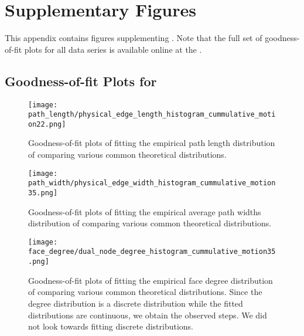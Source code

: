 
\chapter{Supplementary Figures}\label{app:network_analysis}

This appendix contains figures supplementing . Note that the full set of goodness-of-fit plots for all data series is available online at the \SMGR. 

\section{Goodness-of-fit Plots for }

\begin{figure}[!htbp]
\begin{center}%
  \texttt{[image: path\_length/physical\_edge\_length\_histogram\_cummulative\_motion22.png]}
\end{center}%
\caption[Goodness-of-fit plots - Path lengths]{Goodness-of-fit plots of fitting the empirical path length distribution of  comparing various common theoretical distributions.}
\label{fig:sup::path_lengths_goodness}
\end{figure}

\begin{figure}[!htbp]
\begin{center}%
  \texttt{[image: path\_width/physical\_edge\_width\_histogram\_cummulative\_motion35.png]}
\end{center}%
\caption[Goodness-of-fit plots - Path widths]{Goodness-of-fit plots of fitting the empirical average path widths distribution of  comparing various common theoretical distributions.}
\label{fig:sup::path_widths_goodness}
\end{figure}

\begin{figure}[!htbp]
\begin{center}%
  \texttt{[image: face\_degree/dual\_node\_degree\_histogram\_cummulative\_motion35.png]}
\end{center}%
\caption[Goodness-of-fit plots - Face degrees]{Goodness-of-fit plots of fitting the empirical face degree distribution of  comparing various common theoretical distributions. Since the degree distribution is a discrete distribution while the fitted distributions are continuous, we obtain the observed steps. We did not look towards fitting discrete distributions.}
\label{fig:sup::face_degree_goodness}
\end{figure}

